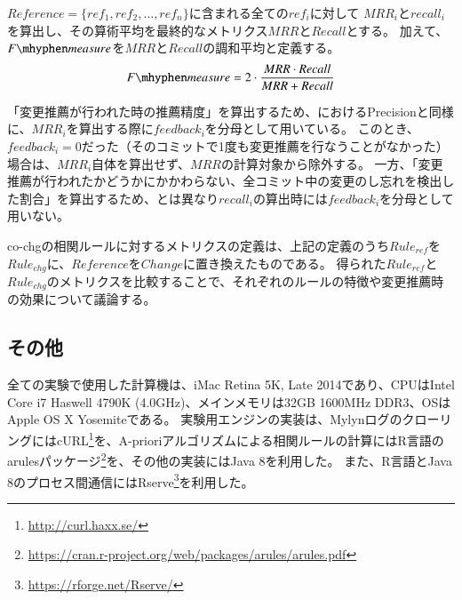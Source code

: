 \documentclass[a4paper]{jsbook}
\newcommand{\fmeasure}{F\mhyphen measure}
\begin{document}
$Re\!f\!erence = \{ref_1, ref_2, \dots, ref_n\}$に含まれる全ての$ref_i$に対して
$MRR_i$と$recall_i$を算出し、その算術平均を最終的なメトリクス$MRR$と$Recall$とする。
加えて、$\fmeasure$を$MRR$と$Recall$の調和平均と定義する。
\begin{equation}
  \fmeasure = 2\cdot\frac{MRR \cdot Recall}{MRR+Recall}
\end{equation}

「変更推薦が行われた時の推薦精度」を算出するため、\cite{Zimmermann:2005}におけるPrecisionと同様に、$MRR_i$を算出する際に$feedback_i$を分母として用いている。
このとき、$feedback_i=0$だった（そのコミットで1度も変更推薦を行なうことがなかった）場合は、$MRR_i$自体を算出せず、$MRR$の計算対象から除外する。
一方、「変更推薦が行われたかどうかにかかわらない、全コミット中の変更のし忘れを検出した割合」を算出するため、\cite{Zimmermann:2005}とは異なり$recall_i$の算出時には$feedback_i$を分母として用いない。

co-chgの相関ルールに対するメトリクスの定義は、上記の定義のうち$Rule_{ref}$を$Rule_{chg}$に、$Reference$を$Change$に置き換えたものである。
得られた$Rule_{ref}$と$Rule_{chg}$のメトリクスを比較することで、それぞれのルールの特徴や変更推薦時の効果について議論する。

\subsection{その他}
全ての実験で使用した計算機は、iMac Retina 5K, Late 2014であり、CPUはIntel Core i7 Haswell 4790K (4.0GHz)、メインメモリは32GB 1600MHz DDR3、OSはApple OS X Yosemiteである。
実験用エンジンの実装は、MylynログのクローリングにはcURL\footnote{\url{http://curl.haxx.se/}}を、A-prioriアルゴリズムによる相関ルールの計算にはR言語のarulesパッケージ\footnote{\url{https://cran.r-project.org/web/packages/arules/arules.pdf}}を、その他の実装にはJava 8を利用した。
また、R言語とJava 8のプロセス間通信にはRserve\footnote{\url{https://rforge.net/Rserve/}}を利用した。
\end{document}
